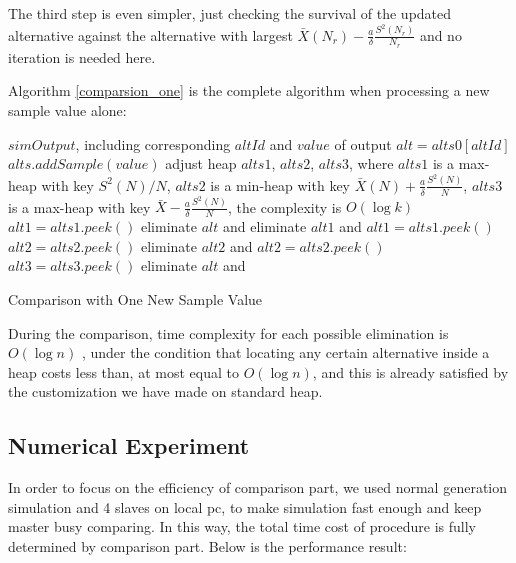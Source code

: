 The third step is even simpler, just checking the survival of the updated alternative against the alternative with largest $\bar{X}(N_r) - \frac{a}{\delta}\frac{S^2(N_r)}{N_r}$ and no iteration is needed here.

Algorithm \ref{comparsion_one} is the complete algorithm when processing a new sample value alone:

\begin{algorithm}
\begin{algorithmic}[1]
\Require $simOutput$, including corresponding $altId$ and $value$ of output
\State $alt = alts0[altId]$ 
  \State \Return
\EndIf
\State $alts.addSample(value)$ 
\State adjust heap $alts1$, $alts2$, $alts3$, where $alts1$ is a max-heap with key $S^2(N)/N$, $alts2$ is a min-heap with key $\bar{X}(N) + \frac{a}{\delta}\frac{S^2(N)}{N}$, $alts3$ is a max-heap with key $\bar{X} - \frac{a}{\delta}\frac{S^2(N)}{N}$, the complexity is $O(\log k)$
\State $alt1 = alts1.peek()$
    \State eliminate $alt$ and \Return {}
  \Else
    \State eliminate $alt1$ and $alt1 = alts1.peek()$ 
  \EndIf
\EndWhile
\State $alt2 = alts2.peek()$
  \State eliminate $alt2$ and $alt2 = alts2.peek()$ 
\EndWhile
\State $alt3 = alts3.peek()$
  \State eliminate $alt$ and \Return {}
\EndIf
\end{algorithmic}
\caption{Comparison with One New Sample Value}
\label{comparsion_one}
\end{algorithm}

During the comparison, time complexity for each possible elimination is $O(\log n)$ , under the condition that locating any certain alternative inside a heap costs less than, at most equal to $O(\log n)$, and this is already satisfied by the customization we have made on standard heap.

\subsection{Numerical Experiment}

In order to focus on the efficiency of comparison part, we used normal generation simulation and 4 slaves on local pc, to make simulation fast enough and keep master busy comparing. In this way, the total time cost of procedure is fully determined by comparison part. Below is the performance result:

